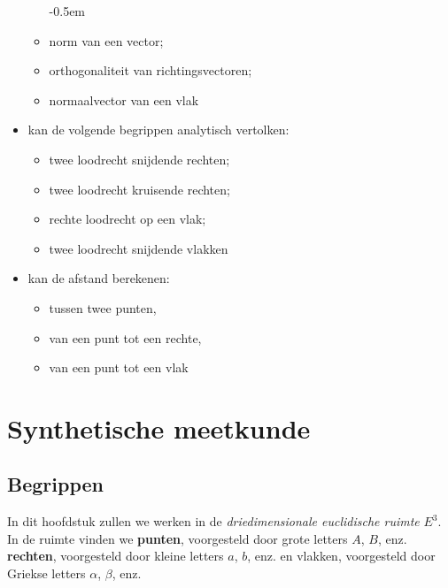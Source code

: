 \documentclass[12pt,twoside]{article}
\begin{document}
\begin{singlespacing}
\begin{itemize}
  \begin{itemize}
    \itemsep-0.5em
    \vspace*{-0.2cm}
  \item norm van een vector;
  \item orthogonaliteit van richtingsvectoren;
  \item normaalvector van een vlak
  \end{itemize}
\item kan de volgende begrippen analytisch vertolken:
  \begin{itemize}
    \itemsep-0.5em
    \vspace*{-0.2cm}
  \item twee loodrecht snijdende rechten;
  \item twee loodrecht kruisende rechten;
  \item rechte loodrecht op een vlak;
  \item twee loodrecht snijdende vlakken
  \end{itemize}
\item kan de afstand berekenen:
  \begin{itemize}
    \itemsep-0.5em
    \vspace*{-0.2cm}
  \item tussen twee punten,
  \item van een punt tot een rechte,
  \item van een punt tot een vlak
  \end{itemize}
\end{itemize}
\end{singlespacing}

\thispagestyle{empty}
\clearpage

\tableofcontents
\thispagestyle{empty}
\clearpage


\pagestyle{fancy}
\fancyhead[RE,LO]{}

\section{Synthetische meetkunde}



\subsection{Begrippen}

In dit hoofdstuk zullen we werken in de {\em driedimensionale euclidische ruimte} $E^3$. In de ruimte vinden we {\bf punten}, voorgesteld door grote letters $A$, $B$, enz. {\bf rechten}, voorgesteld door kleine letters $a$, $b$, enz. en vlakken, voorgesteld door Griekse letters $\alpha$, $\beta$, enz.
\end{document}
